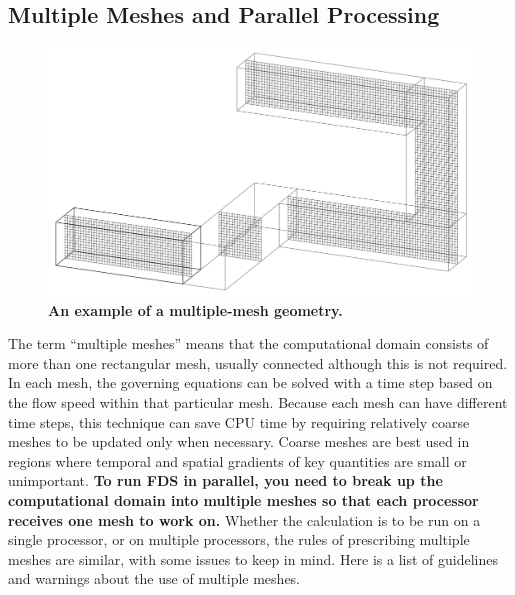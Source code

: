 \documentclass[11pt]{book}
\begin{document}
\subsection{Multiple Meshes and Parallel Processing}
\label{info:multimesh}

\begin{figure}[ht!]
\includegraphics[width=\textwidth]{FIGURES/hallways}
\caption{\bf An example of a multiple-mesh geometry.}
\label{fig:domain}
\end{figure}

The term ``multiple meshes'' means that the computational domain consists of
more than one rectangular mesh, usually connected although this is not
required. In each mesh, the governing equations can be solved with a time
step based on the flow speed within that particular mesh. Because each
mesh can have different time steps, this technique can save CPU time by
requiring relatively coarse meshes to be updated only when necessary.
Coarse meshes are best used in regions where temporal and spatial gradients of key
quantities are small or unimportant.
{\bf To run FDS in parallel, you need to break up the computational domain into
multiple meshes so that each processor receives one mesh to work on.} Whether
the calculation is to be run on a single processor, or on multiple processors,
the rules of prescribing multiple meshes are similar, with some issues to keep in mind.
Here is a list of guidelines and warnings about the use of multiple meshes.
\end{document}
